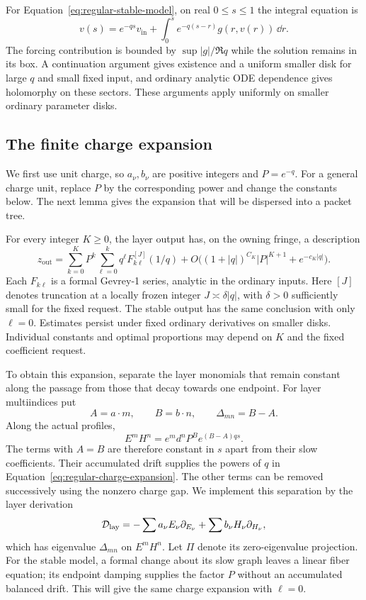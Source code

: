 For Equation~\eqref{eq:regular-stable-model}, on real $0\le s\le1$ the integral
equation is
\[
 v(s)=e^{-qs}v_{\mathrm{in}}+
 \int_0^s e^{-q(s-r)}g(r,v(r))\,\dd r.
\]
The forcing contribution is bounded by $\sup|g|/\Re q$ while the
solution remains in its box.  A continuation argument gives existence
and a uniform smaller disk for large $q$ and small fixed input, and
ordinary analytic ODE dependence gives holomorphy on these sectors.
These arguments apply uniformly on smaller ordinary parameter disks.

\subsection{The finite charge expansion}

We first use unit charge, so $a_\nu,b_\nu$ are positive integers and
$P=e^{-q}$. For a general charge unit, replace $P$ by the corresponding
power and change the constants below. The next lemma gives the expansion
that will be dispersed into a packet tree.

\begin{lemma}\label{lem:regular-charges}
For every integer $K\ge0$, the layer output has, on the owning
fringe, a description
\begin{equation}\label{eq:regular-charge-expansion}
 z_{\mathrm{out}}=
 \sum_{k=0}^K P^k\sum_{\ell=0}^k q^\ell
          F_{k\ell}^{[J]}(1/q)
 +O\bigl((1+|q|)^{C_K}|P|^{K+1}+e^{-c_K|q|}\bigr).
\end{equation}
Each $F_{k\ell}$ is a formal Gevrey-1 series, analytic in the ordinary
inputs. Here $[J]$ denotes truncation at a locally frozen integer
$J\asymp\delta|q|$, with $\delta>0$ sufficiently small for the fixed
request.  The stable output has the same conclusion with only
$\ell=0$.  Estimates persist under fixed ordinary derivatives on
smaller disks.  Individual constants and optimal proportions may
depend on $K$ and the fixed coefficient request.
\end{lemma}

To obtain this expansion, separate the layer monomials that remain
constant along the passage from those that decay towards one endpoint.
For layer multiindices put
\[
 A=a\cdot m,\qquad B=b\cdot n,\qquad \Delta_{mn}=B-A.
\]
Along the actual profiles,
\[
 E^mH^n=e^m d^n P^B e^{(B-A)qs}.
\]
The terms with $A=B$ are therefore constant in $s$ apart from their
slow coefficients. Their accumulated drift supplies the powers of $q$
in Equation~\eqref{eq:regular-charge-expansion}. The other terms can be
removed successively using the nonzero charge gap. We implement this
separation by the layer derivation
\[
 \mathcal D_{\rm lay}=-\sum a_\nu E_\nu\partial_{E_\nu}
                  +\sum b_\nu H_\nu\partial_{H_\nu},
\]
which has eigenvalue $\Delta_{mn}$ on $E^mH^n$.
Let $\Pi$ denote its zero-eigenvalue projection. For the stable model,
a formal change about its slow graph leaves a linear fiber equation;
its endpoint damping supplies the factor $P$ without an accumulated
balanced drift. This will give the same charge expansion with $\ell=0$.

